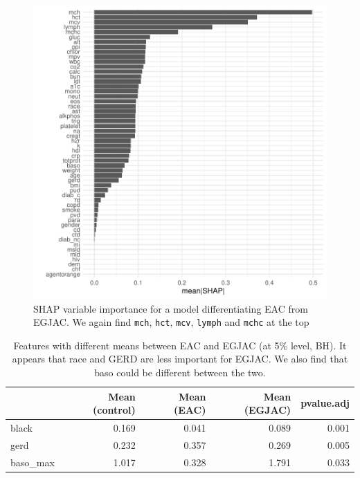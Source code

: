\documentclass[12pt]{article}
\begin{document}
\begin{figure}[h]
\centering
\includegraphics[width=1.0\textwidth]{figures/eac_v_egjac/vs_shap_groups.pdf}
\caption{SHAP variable importance for a model differentiating EAC from EGJAC. We
again find \texttt{mch}, \texttt{hct}, \texttt{mcv}, \texttt{lymph} and \texttt{mchc} at the top}
\end{figure}




\begin{table}[ht]
\centering
\begin{tabular}{lrrrr}
\hline
& Mean (control) & Mean (EAC) & Mean (EGJAC) & pvalue.adj \\
\hline
black & 0.169 & 0.041 & 0.089 & 0.001 \\ 
  gerd & 0.232 & 0.357 & 0.269 & 0.005 \\ 
  baso\_max & 1.017 & 0.328 & 1.791 & 0.033 \\ 
\hline
\end{tabular}
\caption{Features with different means between EAC and EGJAC (at 5\% level, BH). It appears that race and GERD are less important for EGJAC. 
We also find that baso could be different between the two.}
\end{table}
\end{document}
